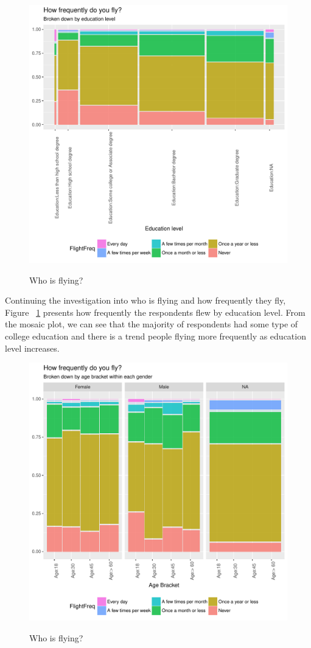 \documentclass[DIV=calc, paper=a4, fontsize=10pt, twocolumn]{scrartcl}	 %
\begin{document}
\begin{figure}[h!]
\caption{Who is flying?}
\centering
\includegraphics{flying-who2}
\label{fig: who2}
\end{figure}

\par Continuing the investigation into who is flying and how frequently they fly, Figure ~\ref{fig: who2} presents how frequently the respondents flew by education level. From the mosaic plot, we can see that the majority of respondents had some type of college education and there is a trend people flying more frequently as education level increases.

\begin{figure}[h!]
\caption{Who is flying?}
\centering
\includegraphics{flying-who3}
\label{fig: who3}
\end{figure}
\end{document}
